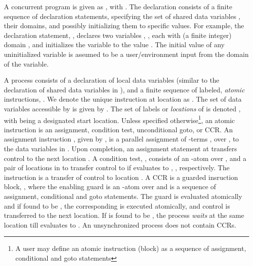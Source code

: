 A concurrent program is given as , with . The declaration
consists of a finite sequence of declaration statements, specifying
the set of shared data variables , their domains, and possibly
initializing them to specific values. For example, the declaration
statement, , declares two
variables , , each with (a finite integer) domain
, and initializes the variable  to the value .
The initial value of any uninitialized variable is assumed to be a
user/environment input from the domain of the variable. 

A process  consists of a declaration of local data variables
 (similar to the declaration of shared data variables in ),
and a finite sequence of labeled, {\em atomic} instructions, .  We denote the unique instruction at location  as .
The set of data variables  accessible by  is given by . The set of labels or {\em locations} of  is denoted
, with  being a designated
start location. Unless specified otherwise\footnote{A user may define
an atomic instruction (block) as a sequence of assignment, conditional 
and goto statements}, an atomic instruction  is an assignment,
condition test, unconditional goto, or CCR. An assignment instruction
, given by , is a parallel assignment of -terms , over , to the data variables 
in . Upon completion, an assignment statement at 
transfers control to the next location . A condition test,
, consists of an -atom 
over , and a pair of locations  in  to
transfer control to if  evaluates to , ,
respectively. The instruction  is a transfer of
control to location . A CCR is a guarded insruction block,
, where the enabling guard  is an -atom
over  and  is a sequence of assignment,
conditional and goto statements. The guard  is evaluated atomically
and if found to be , the corresponding  is
executed atomically, and control is transferred to the next location.
If  is found to be , the process {\em waits} at the same
location till  evaluates to . An unsynchronized process does
not contain CCRs.  





